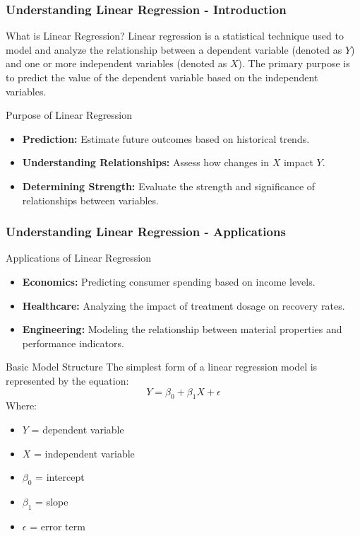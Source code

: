 \documentclass[aspectratio=169]{beamer}
\begin{document}
\begin{frame}[fragile]
    \frametitle{Understanding Linear Regression - Introduction}
    \begin{block}{What is Linear Regression?}
        Linear regression is a statistical technique used to model and analyze the relationship between a dependent variable (denoted as \(Y\)) and one or more independent variables (denoted as \(X\)). 
        The primary purpose is to predict the value of the dependent variable based on the independent variables.
    \end{block}
    
    \begin{block}{Purpose of Linear Regression}
        \begin{itemize}
            \item \textbf{Prediction:} Estimate future outcomes based on historical trends.
            \item \textbf{Understanding Relationships:} Assess how changes in \(X\) impact \(Y\).
            \item \textbf{Determining Strength:} Evaluate the strength and significance of relationships between variables.
        \end{itemize}
    \end{block}
\end{frame}

\begin{frame}[fragile]
    \frametitle{Understanding Linear Regression - Applications}
    \begin{block}{Applications of Linear Regression}
        \begin{itemize}
            \item \textbf{Economics:} Predicting consumer spending based on income levels.
            \item \textbf{Healthcare:} Analyzing the impact of treatment dosage on recovery rates.
            \item \textbf{Engineering:} Modeling the relationship between material properties and performance indicators.
        \end{itemize}
    \end{block}
    
    \begin{block}{Basic Model Structure}
        The simplest form of a linear regression model is represented by the equation:
        \begin{equation}
            Y = \beta_0 + \beta_1 X + \epsilon
        \end{equation}
        Where:
        \begin{itemize}
            \item \(Y\) = dependent variable
            \item \(X\) = independent variable
            \item \(\beta_0\) = intercept
            \item \(\beta_1\) = slope
            \item \(\epsilon\) = error term
        \end{itemize}
    \end{block}
\end{frame}
\end{document}
